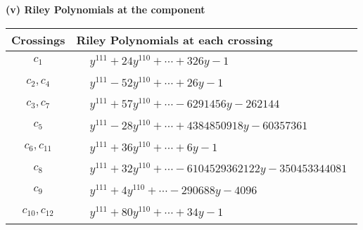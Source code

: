 \documentclass[1p]{elsarticle_modified}
\theoremstyle{definition}
\begin{document}
\newpage\renewcommand{\arraystretch}{1}
\flushleft \textbf{(v) Riley Polynomials at the component}\newline \\
\begin{tabular}{m{50pt}|m{274pt}}
Crossings & \hspace{64pt}Riley Polynomials at each crossing \\
\hline $$\begin{aligned}c_{1}\end{aligned}$$&$\begin{aligned}
&y^{111}+24 y^{110}+\cdots+326 y-1
\end{aligned}$\\
\hline $$\begin{aligned}c_{2},c_{4}\end{aligned}$$&$\begin{aligned}
&y^{111}-52 y^{110}+\cdots+26 y-1
\end{aligned}$\\
\hline $$\begin{aligned}c_{3},c_{7}\end{aligned}$$&$\begin{aligned}
&y^{111}+57 y^{110}+\cdots-6291456 y-262144
\end{aligned}$\\
\hline $$\begin{aligned}c_{5}\end{aligned}$$&$\begin{aligned}
&y^{111}-28 y^{110}+\cdots+4384850918 y-60357361
\end{aligned}$\\
\hline $$\begin{aligned}c_{6},c_{11}\end{aligned}$$&$\begin{aligned}
&y^{111}+36 y^{110}+\cdots+6 y-1
\end{aligned}$\\
\hline $$\begin{aligned}c_{8}\end{aligned}$$&$\begin{aligned}
&y^{111}+32 y^{110}+\cdots-6104529362122 y-350453344081
\end{aligned}$\\
\hline $$\begin{aligned}c_{9}\end{aligned}$$&$\begin{aligned}
&y^{111}+4 y^{110}+\cdots-290688 y-4096
\end{aligned}$\\
\hline $$\begin{aligned}c_{10},c_{12}\end{aligned}$$&$\begin{aligned}
&y^{111}+80 y^{110}+\cdots+34 y-1
\end{aligned}$\\
\hline
\end{tabular}\\~\\
\end{document}
